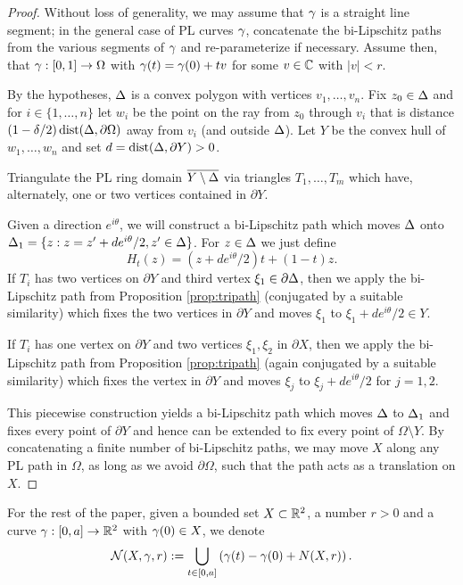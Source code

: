 \documentclass{amsart}
\DeclareMathOperator{\dist}{dist}
\begin{document}
\begin{proof}
Without loss of generality, we may assume that $\gamma$ is a straight line segment; in the general case of PL curves $\gamma$, concatenate the bi-Lipschitz paths from the various segments of $\gamma$ and re-parameterize if necessary. Assume then, that $\gamma:[0,1] \to \Omega$ with $\gamma(t) = \gamma(0) + tv$ for some $v \in \mathbb{C}$ with $|v|<r$. 

By the hypotheses, $\Delta$ is a convex polygon with vertices $v_1,\ldots, v_n$. 
Fix $z_0 \in \Delta$ and for $i \in \{1,\ldots, n \}$ let $w_i$ be the point on the ray from $z_0$ through $v_i$ that is distance $(1-\delta /2)\dist (\D,\partial \Omega)$ away from $v_i$ (and outside $\Delta$). Let $Y$ be the convex hull of $w_1,\ldots, w_n$ and set $d = \dist (\D, \partial Y)>0$.

Triangulate the PL ring domain $\overline{Y\setminus \Delta}$ via triangles $T_1,\ldots, T_m$ which have, alternately, one or two vertices contained in $\partial Y$.

Given a direction $e^{i\theta}$, we will construct a bi-Lipschitz path which moves $\Delta$ onto $\Delta_1 = \{z : z = z' + de^{i\theta}/2, z' \in \Delta \}$. For $z \in \Delta$ we just define
\[ H_t(z) = (z+de^{i\theta}/2 ) t + (1-t)z.\]
If $T_i$ has two vertices on $\partial Y$ and third vertex $\xi_1\in \partial \Delta$, then we apply the bi-Lipschitz path from Proposition \ref{prop:tripath} (conjugated by a suitable similarity) which fixes the two vertices in $\partial Y$ and moves $\xi_1$ to $\xi_1 + de^{i\theta}/2 \in Y$.

If $T_i$ has one vertex on $\partial Y$ and two vertices $\xi_1,\xi_2$ in $\partial X$, then we apply the bi-Lipschitz path from Proposition \ref{prop:tripath} (again conjugated by a suitable similarity) which fixes the vertex in $\partial Y$ and moves $\xi_j$ to $\xi_j + de^{i\theta}/2$ for $j=1,2$.

This piecewise construction yields a bi-Lipschitz path which moves $\Delta$ to $\Delta_1$ and fixes every point of $\partial Y$ and hence can be extended to fix every point of $\Omega \setminus Y$.
By concatenating a finite number of bi-Lipschitz paths, we may move $X$ along any PL path in $\Omega$, as long as we avoid $\partial \Omega$, such that the path acts as a translation on $X$. \end{proof}





For the rest of the paper, given a bounded set $X \subset \mathbb{R}^2$, a number $r>0$ and a curve $\gamma :[0,a] \to \mathbb{R}^2$ with $\gamma(0) \in X$, we denote
\[ \mathcal{N}(X,\gamma, r) := \bigcup_{t\in[0,a]} \left(\gamma(t)-\gamma(0) + N(X,r)\right).\]
\end{document}
